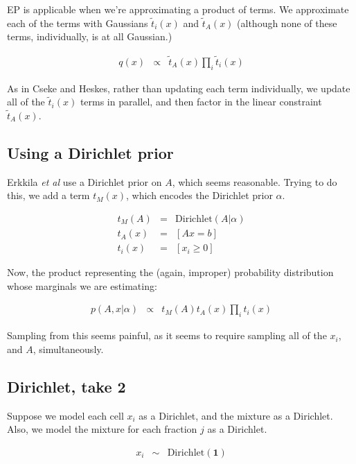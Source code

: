 \documentclass{article}
\begin{document}
EP is applicable when we're approximating a product of terms. We approximate each of the terms with
Gaussians
$\tilde{t}_i(x)$ and $\tilde{t}_A(x)$ (although none of these
terms, individually, is at all Gaussian.) 

\begin{eqnarray}
q(x) & \propto & \tilde{t}_A(x) \prod_i \tilde{t}_i(x)
\end{eqnarray}

As in Cseke and Heskes, rather than updating each term individually,
we update all of the $\tilde{t}_i(x)$ terms in parallel, and then factor in
the linear constraint $\tilde{t}_A(x)$.


\subsection{Using a Dirichlet prior}

Erkkila {\em et al} use a Dirichlet prior on $A$, which seems reasonable. Trying to do
this, we add a term $t_M(x)$, which encodes the Dirichlet prior $\alpha$.

\begin{eqnarray}
t_M(A) & = & \mathrm{Dirichlet}(A|\alpha) \\
t_A(x) & = & [Ax = b] \\
t_i(x) & = & [x_i \ge 0]
\end{eqnarray}

Now, the product representing the (again, improper) probability distribution
whose marginals we are estimating:

\begin{eqnarray}
p(A, x|\alpha) & \propto & t_M(A) t_A(x) \prod_i t_i(x)
\end{eqnarray}

Sampling from this seems painful, as it seems to require sampling all of
the $x_i$, and $A$, simultaneously.


\subsection{Dirichlet, take 2}

Suppose we model each cell $x_i$ as a Dirichlet, and the mixture as a Dirichlet.
Also, we model the mixture for each fraction $j$ as a Dirichlet.

\begin{eqnarray}
x_i & \sim & \mathrm{Dirichlet}(\mathbf{1}) \\

\end{eqnarray}
\end{document}

